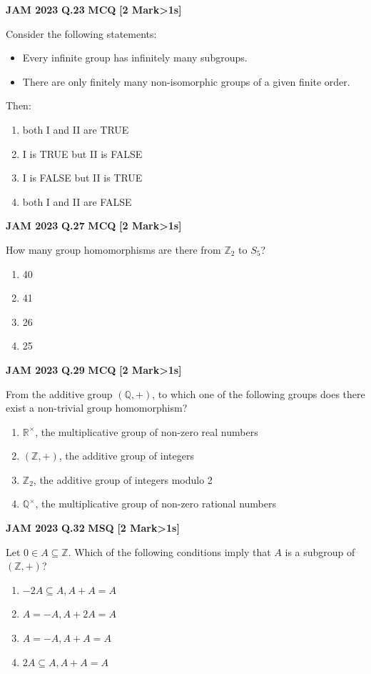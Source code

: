 \documentclass[11pt,a4paper]{article}
\newcommand{\pyqheader}[4]{%
    \noindent\begin{tcolorbox}[
        colback=badgebg,
        colframe=secondary,
        arc=2mm,
        boxrule=0.6pt,
        top=1.5mm,bottom=1.5mm,left=2mm,right=2mm
    ]
        \textbf{\textcolor{primary}{JAM #1}} \hfill \textbf{Q.#2} \hfill \textsc{\textbf{#3}} \hfill \textbf{[#4 Mark\ifnum#4>1s\fi]}
    \end{tcolorbox}\vspace{-1mm}
}
\begin{document}
\pyqheader{2023}{23}{MCQ}{2}
Consider the following statements:
\begin{itemize}
    \item[I.] Every infinite group has infinitely many subgroups.
    \item[II.] There are only finitely many non-isomorphic groups of a given finite order.
\end{itemize}
Then:
\begin{enumerate}[label=(\Alph*)]
    \item both I and II are TRUE
    \item I is TRUE but II is FALSE
    \item I is FALSE but II is TRUE
    \item both I and II are FALSE
\end{enumerate}

\pyqheader{2023}{27}{MCQ}{2}
How many group homomorphisms are there from $\mathbb{Z}_2$ to $S_5$?
\begin{enumerate}[label=(\Alph*)]
    \item 40
    \item 41
    \item 26
    \item 25
\end{enumerate}

\pyqheader{2023}{29}{MCQ}{2}
From the additive group $(\mathbb{Q},+)$, to which one of the following groups does there exist a non-trivial group homomorphism?
\begin{enumerate}[label=(\Alph*)]
    \item $\mathbb{R}^{\times}$, the multiplicative group of non-zero real numbers
    \item $(\mathbb{Z},+)$, the additive group of integers
    \item $\mathbb{Z}_2$, the additive group of integers modulo 2
    \item $\mathbb{Q}^{\times}$, the multiplicative group of non-zero rational numbers
\end{enumerate}

\pyqheader{2023}{32}{MSQ}{2}
Let $0\in A\subseteq\mathbb{Z}$. Which of the following conditions imply that $A$ is a subgroup of $(\mathbb{Z},+)$?
\begin{enumerate}[label=(\Alph*)]
    \item $-2A\subseteq A, A+A=A$
    \item $A=-A, A+2A=A$
    \item $A=-A, A+A=A$
    \item $2A\subseteq A, A+A=A$
\end{enumerate}
\end{document}
